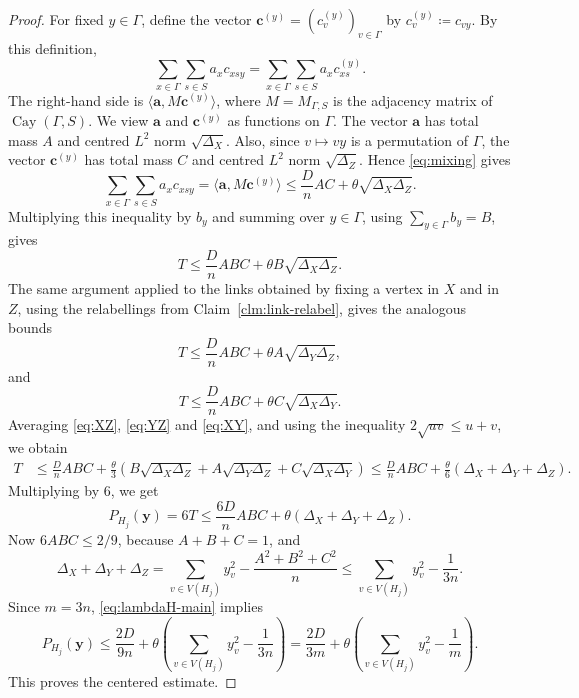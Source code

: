 \documentclass[10pt,a4paper]{amsart}
\DeclareMathOperator{\Cay}{Cay}
\begin{document}
\begin{proof}
For fixed $y\in\Gamma$, define the vector $\mathbf{c}^{(y)}=(c^{(y)}_v)_{v\in\Gamma}$ by $c^{(y)}_v\coloneqq c_{vy}$. By this definition,
\[
        \sum_{x\in\Gamma}\sum_{s\in S}a_xc_{xsy} = \sum_{x\in\Gamma}\sum_{s\in S}a_xc^{(y)}_{xs}.
\]
The right-hand side is $\langle \mathbf{a},M\mathbf{c}^{(y)}\rangle$, where $M=M_{\Gamma,S}$ is the adjacency matrix of $\Cay(\Gamma,S)$. We view $\mathbf{a}$ and $\mathbf{c}^{(y)}$ as functions on $\Gamma$. The vector $\mathbf{a}$ has total mass $A$ and centred $L^2$ norm $\sqrt{\Delta_X}$. Also, since $v\mapsto vy$ is a permutation of $\Gamma$, the vector $\mathbf{c}^{(y)}$ has total mass $C$ and centred $L^2$ norm $\sqrt{\Delta_Z}$. Hence \eqref{eq:mixing} gives
\[
        \sum_{x\in\Gamma}\sum_{s\in S}a_xc_{xsy}
        = \langle \mathbf{a},M\mathbf{c}^{(y)}\rangle
        \le \frac{D}{n}AC+\theta\sqrt{\Delta_X\Delta_Z}.
\]
Multiplying this inequality by $b_y$ and summing over $y\in\Gamma$, using $\sum_{y\in\Gamma} b_y=B$, gives
\begin{equation}
        T\le \frac{D}{n}ABC+\theta B\sqrt{\Delta_X\Delta_Z}.
        \label{eq:XZ}
\end{equation}
The same argument applied to the links obtained by fixing a vertex in $X$ and in $Z$, using the relabellings from Claim~\ref{clm:link-relabel}, gives the analogous bounds
\begin{equation}
        T\le \frac{D}{n}ABC+\theta A\sqrt{\Delta_Y\Delta_Z},
        \label{eq:YZ}
\end{equation}
and
\begin{equation}
        T\le \frac{D}{n}ABC+\theta C\sqrt{\Delta_X\Delta_Y}.
        \label{eq:XY}
\end{equation}
Averaging \eqref{eq:XZ}, \eqref{eq:YZ} and \eqref{eq:XY}, and using the inequality $2\sqrt{uv}\le u+v$, we obtain
\begin{align*}
        T
        &\le \frac{D}{n}ABC
        +\frac{\theta}{3}
        \left(
        B\sqrt{\Delta_X\Delta_Z}
        +A\sqrt{\Delta_Y\Delta_Z}
        +C\sqrt{\Delta_X\Delta_Y}
        \right) 
        \le \frac{D}{n}ABC
        +\frac{\theta}{6}(\Delta_X+\Delta_Y+\Delta_Z).
\end{align*}
Multiplying by $6$, we get
\begin{equation}
        P_{H_j}(\mathbf{y})
        = 6T
        \le \frac{6D}{n}ABC +\theta(\Delta_X+\Delta_Y+\Delta_Z).
        \label{eq:lambdaH-main}
\end{equation}
Now $6ABC\le 2/9$, because $A+B+C=1$, and
\[
        \Delta_X+\Delta_Y+\Delta_Z =\sum_{v\in V(H_j)}y_v^2-\frac{A^2+B^2+C^2}{n} \le \sum_{v\in V(H_j)}y_v^2-\frac1{3n}.
\]
Since $m=3n$, \eqref{eq:lambdaH-main} implies
\[
        P_{H_j}(\mathbf{y}) \le \frac{2D}{9n} +\theta\left(\sum_{v\in V(H_j)}y_v^2-\frac1{3n}\right) = \frac{2D}{3m} +\theta\left(\sum_{v\in V(H_j)}y_v^2-\frac1m\right).
\]
This proves the centered estimate.
\end{proof}
\end{document}
